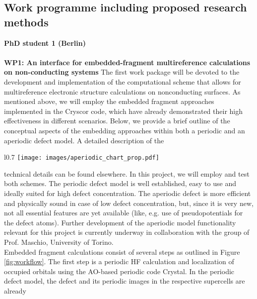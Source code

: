 \documentclass[a4paper,11pt,headings=normal]{scrartcl}
\begin{document}
\subsection{Work programme including proposed research methods} 
\noindent
\textbf{PhD student 1 (Berlin)}\\
\ \\
\textbf{WP1: An interface for embedded-fragment multireference calculations on 
non-conducting systems} The first work package will be devoted to the development 
and implementation of the computational scheme that allows for multireference 
electronic structure calculations on nonconducting surfaces. As
mentioned above, we will employ the embedded fragment approaches implemented in 
the Cryscor code, which have already demonstrated their high effectiveness in 
different scenarios.\autocite{masur2016, schutz2017, usvyat18, mullan21, 
christlmaier21, Lavroff2024} Below, we provide a brief outline of the conceptual 
aspects of the embedding approaches within both a periodic and an aperiodic 
defect model. A detailed description of the 
\begin{wrapfigure}{l}{0.7\textwidth}
	\centering
	\vspace{-0.5em}
	\texttt{[image: images/aperiodic\_chart\_prop.pdf]}
	\caption{Periodic and aperiodic defect models and the workflows of the 
	corresponding embedded fragment calculations} 
	\label{fig:workflow}
	\vspace{-1.5em}
\end{wrapfigure}
technical details can be found 
elsewhere.\autocite{christlmaier21,Lavroff2024} In this project, we will employ 
and test both schemes.
The periodic defect model is well established, easy to 
use and ideally suited for high defect concentration. The aperiodic 
defect is more efficient and physically sound in case of low defect 
concentration, but, since it is very new, not all essential features are yet 
available (like, e.g. use of pseudopotentials for the defect atoms).
Further 
development of the aperiodic model functionality relevant for this project is 
currently underway in collaboration with the group of Prof. Maschio, University 
of Torino.\\
Embedded fragment calculations consist of several steps as outlined in Figure 
\ref{fig:workflow}.
The first step is a periodic HF calculation and  
localization of occupied orbitals using the AO-based periodic code Crystal.\autocite{Crystal17} In the periodic defect model, the defect and its periodic images in the respective supercells are already 
\end{document}
